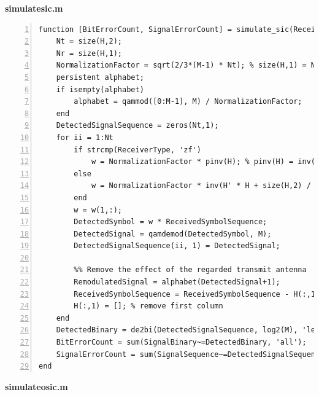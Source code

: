 \documentclass{article}
\newcommand{\bd}{\textbf} %
\begin{document}
\noindent\bd{simulate\textunderscore sic.m}
\begin{lstlisting}[style=Matlab-editor, frame=single, numbers=left,]
function [BitErrorCount, SignalErrorCount] = simulate_sic(ReceivedSymbolSequence, SignalSequence, SignalBinary,  M, H, EsN0, ReceiverType)
    Nt = size(H,2);
    Nr = size(H,1);
    NormalizationFactor = sqrt(2/3*(M-1) * Nt); % size(H,1) = Nt
    persistent alphabet;
    if isempty(alphabet)
        alphabet = qammod([0:M-1], M) / NormalizationFactor;
    end
    DetectedSignalSequence = zeros(Nt,1);
    for ii = 1:Nt
        if strcmp(ReceiverType, 'zf')
            w = NormalizationFactor * pinv(H); % pinv(H) = inv(H' * H) * H'
        else
            w = NormalizationFactor * inv(H' * H + size(H,2) / EsN0 * eye(size(H,2))) * H';
        end
        w = w(1,:);
        DetectedSymbol = w * ReceivedSymbolSequence;
        DetectedSignal = qamdemod(DetectedSymbol, M);
        DetectedSignalSequence(ii, 1) = DetectedSignal;
        
        %% Remove the effect of the regarded transmit antenna
        RemodulatedSignal = alphabet(DetectedSignal+1);
        ReceivedSymbolSequence = ReceivedSymbolSequence - H(:,1) * RemodulatedSignal;
        H(:,1) = []; % remove first column
    end
    DetectedBinary = de2bi(DetectedSignalSequence, log2(M), 'left-msb');
    BitErrorCount = sum(SignalBinary~=DetectedBinary, 'all');
    SignalErrorCount = sum(SignalSequence~=DetectedSignalSequence, 'all');
end

\end{lstlisting}
\noindent\bd{simulate\textunderscore osic.m}
\end{document}
